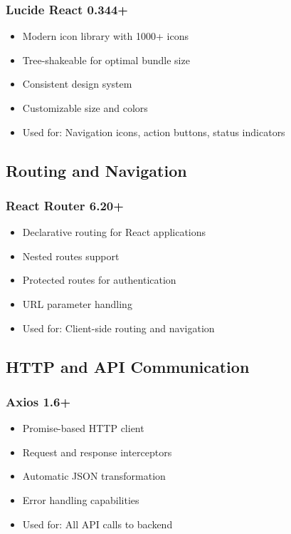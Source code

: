 \documentclass[12pt,a4paper]{report}
\begin{document}
\subsubsection{Lucide React 0.344+}
\begin{itemize}[leftmargin=*]
    \item Modern icon library with 1000+ icons
    \item Tree-shakeable for optimal bundle size
    \item Consistent design system
    \item Customizable size and colors
    \item Used for: Navigation icons, action buttons, status indicators
\end{itemize}

\subsection{Routing and Navigation}

\subsubsection{React Router 6.20+}
\begin{itemize}[leftmargin=*]
    \item Declarative routing for React applications
    \item Nested routes support
    \item Protected routes for authentication
    \item URL parameter handling
    \item Used for: Client-side routing and navigation
\end{itemize}

\subsection{HTTP and API Communication}

\subsubsection{Axios 1.6+}
\begin{itemize}[leftmargin=*]
    \item Promise-based HTTP client
    \item Request and response interceptors
    \item Automatic JSON transformation
    \item Error handling capabilities
    \item Used for: All API calls to backend
\end{itemize}
\end{document}
